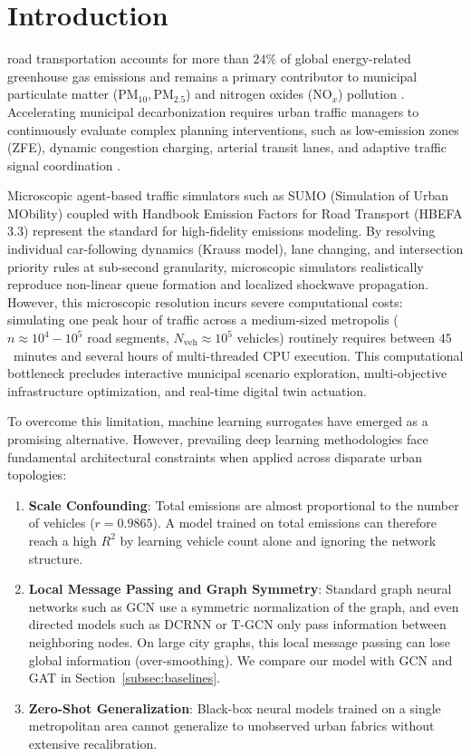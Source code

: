 \documentclass[journal]{IEEEtran}
\begin{document}
\section{Introduction}

 road transportation accounts for more than $24\%$ of global energy-related greenhouse gas emissions and remains a primary contributor to municipal particulate matter ($\text{PM}_{10}, \text{PM}_{2.5}$) and nitrogen oxides ($\text{NO}_x$) pollution \cite{IEA2023, UN2022}. Accelerating municipal decarbonization requires urban traffic managers to continuously evaluate complex planning interventions, such as low-emission zones (ZFE), dynamic congestion charging, arterial transit lanes, and adaptive traffic signal coordination \cite{Bell1997, Sheffi1985}. 

Microscopic agent-based traffic simulators such as SUMO (Simulation of Urban MObility) \cite{Krajzewicz2012} coupled with Handbook Emission Factors for Road Transport (HBEFA 3.3) \cite{Keller2017} represent the standard for high-fidelity emissions modeling. By resolving individual car-following dynamics (Krauss model), lane changing, and intersection priority rules at sub-second granularity, microscopic simulators realistically reproduce non-linear queue formation and localized shockwave propagation. However, this microscopic resolution incurs severe computational costs: simulating one peak hour of traffic across a medium-sized metropolis ($n \approx 10^4 - 10^5$ road segments, $N_{\text{veh}} \approx 10^5$ vehicles) routinely requires between $45$~minutes and several hours of multi-threaded CPU execution. This computational bottleneck precludes interactive municipal scenario exploration, multi-objective infrastructure optimization, and real-time digital twin actuation.

To overcome this limitation, machine learning surrogates have emerged as a promising alternative. However, prevailing deep learning methodologies face fundamental architectural constraints when applied across disparate urban topologies:
\begin{enumerate}
    \item \textbf{Scale Confounding}: Total emissions are almost proportional to the number of vehicles ($r = 0.9865$). A model trained on total emissions can therefore reach a high $R^2$ by learning vehicle count alone and ignoring the network structure.
    \item \textbf{Local Message Passing and Graph Symmetry}: Standard graph neural networks such as GCN \cite{Kipf2017} use a symmetric normalization of the graph, and even directed models such as DCRNN \cite{Li2018} or T-GCN \cite{Zhao2020} only pass information between neighboring nodes. On large city graphs, this local message passing can lose global information (over-smoothing). We compare our model with GCN and GAT in Section~\ref{subsec:baselines}.
    \item \textbf{Zero-Shot Generalization}: Black-box neural models trained on a single metropolitan area cannot generalize to unobserved urban fabrics without extensive recalibration.
\end{enumerate}
\end{document}
